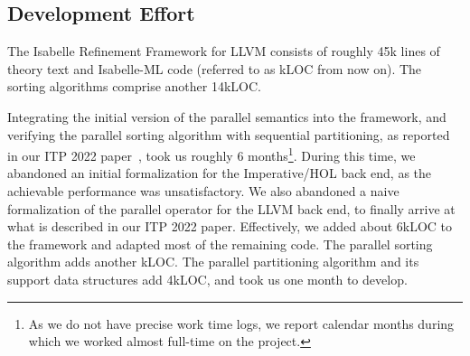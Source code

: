 \documentclass[sn-mathphys,Numbered]{sn-jnl}
\theoremstyle{thmstyleone}%
\theoremstyle{definition}%
\theoremstyle{thmstylethree}%
\begin{document}
    \subsection{Development Effort}
    The Isabelle Refinement Framework for LLVM consists of roughly 45k lines of theory text and Isabelle-ML code (referred to as kLOC from now on). The sorting algorithms comprise another 14kLOC.

    Integrating the initial version of the parallel semantics into the framework, and verifying the parallel sorting algorithm with sequential partitioning, as reported in our ITP 2022 paper~\cite{La22}, took us roughly 6 months\footnote{As we do not have precise work time logs, we report calendar months during which we worked almost full-time on the project.}. During this time, we abandoned an initial formalization for the Imperative/HOL back end, as the achievable performance was unsatisfactory. We also abandoned a naive formalization of the parallel operator for the LLVM back end, to finally arrive at what is described in our ITP 2022 paper. Effectively, we added about 6kLOC to the framework and adapted most of the remaining code. The parallel sorting algorithm adds another kLOC.
    The parallel partitioning algorithm and its support data structures add 4kLOC, and took us one month to develop.

%
%
%
%
%
%
%
%
%
%
%
%
%
%
%
%
%
%
%
%
%
\end{document}
